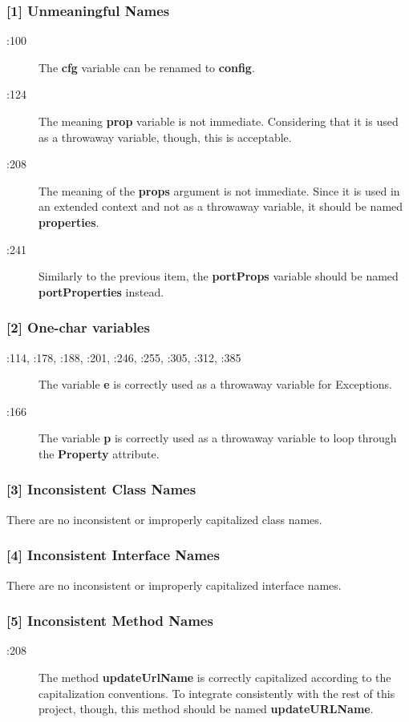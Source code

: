 \subsubsection{[1] Unmeaningful Names}
\begin{description}
	\item[:100] The \textbf{cfg} variable can be renamed to \textbf{config}.
	\item[:124] The meaning \textbf{prop} variable is not immediate. Considering that it is used as a throwaway variable, though, this is acceptable.
	\item[:208] The meaning of the \textbf{props} argument is not immediate. Since it is used in an extended context and not as a throwaway variable, it should be named \textbf{properties}.
	\item[:241] Similarly to the previous item, the \textbf{portProps} variable should be named \textbf{portProperties} instead.
\end{description}


\subsubsection{[2] One-char variables}
\begin{description}
	\item[:114, :178, :188, :201, :246, :255, :305, :312, :385] The variable \textbf{e} is correctly used as a throwaway variable for Exceptions.
	\item[:166] The variable \textbf{p} is correctly used as a throwaway variable to loop through the \textbf{Property} attribute.
\end{description}

\subsubsection{[3] Inconsistent Class Names}
There are no inconsistent or improperly capitalized class names.

\subsubsection{[4] Inconsistent Interface Names}
There are no inconsistent or improperly capitalized interface names.

\subsubsection{[5] Inconsistent Method Names}
\begin{description}
	\item[:208] The method \textbf{updateUrlName} is correctly capitalized according to the capitalization conventions. To integrate consistently with the rest of this project, though, this method should be named \textbf{updateURLName}.
\end{description}

